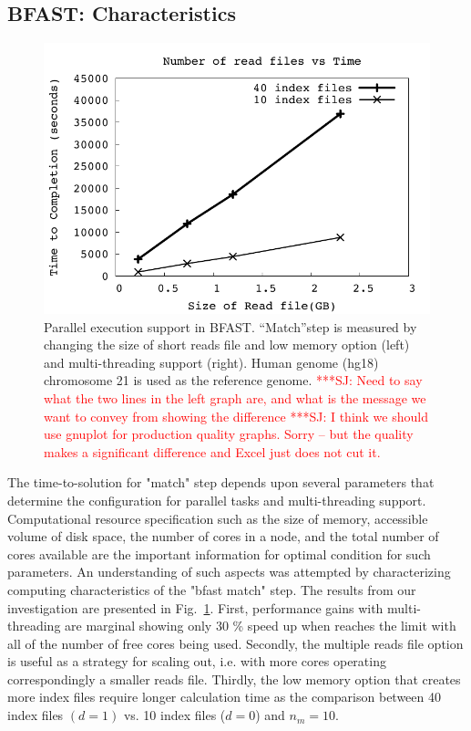 \documentclass[12pt]{article}
\newcommand{\jhanote}[1]{ {\textcolor{red}     {***SJ: #1}}}
\newcommand{\jhanote}[1]{}
\begin{document}


\subsection{BFAST: Characteristics}

\begin{figure}
 \centering
\includegraphics[scale=0.66]{figures/readsvstime.pdf}

\caption{\small Parallel execution support in BFAST.  ``Match''step is measured by changing the size of short reads file and low memory option (left) and multi-threading support (right).  Human genome (hg18) chromosome 21 is used as the reference genome. \jhanote{Need to say what the two lines in the left graph are, and what is the message we want to convey from showing the difference} \jhanote{I think we should use gnuplot for production quality graphs. Sorry -- but the quality makes a significant difference and Excel just does not cut it.}}
  \label{fig:parallel-execution} 
 \end{figure}


The time-to-solution for "match" step depends upon several parameters that determine the configuration for parallel tasks and multi-threading support.  Computational resource specification such as the size of memory, accessible volume of disk space, the number of cores in a node, and the total number of cores available are the important information for optimal condition for such parameters.  An understanding of such aspects was attempted by characterizing computing characteristics of the "bfast match" step.  The results from our investigation are presented  in Fig.~\ref{fig:parallel-execution}. First, performance gains with multi-threading are marginal showing only 30 \% speed up when reaches the limit with all of the number of free cores being used.  
Secondly, the multiple reads file option is useful as a strategy for scaling out, i.e. with more cores operating correspondingly a smaller reads file.  Thirdly, the low memory option that creates more index files require longer calculation time as the comparison between 40 index files $(d = 1)$ vs. 10 index files ($ d = 0 $) and $n_m = 10$.   
\end{document}
